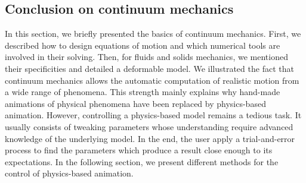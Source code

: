 \subsection{Conclusion on continuum mechanics}
In this section, we briefly presented the basics of continuum mechanics.
First, we described how to design equations of motion and which numerical tools are involved in their solving. 
Then, for fluids and solids mechanics, we mentioned their specificities and detailed a deformable model.
We illustrated the fact that continuum mechanics allows the automatic computation of realistic motion from a wide range of phenomena.
This strength mainly explains why hand-made animations of physical phenomena have been replaced by physics-based animation.
However, controlling a physics-based model remains a tedious task. 
It usually consists of tweaking parameters whose understanding require advanced knowledge of the underlying model. 
In the end, the user apply a trial-and-error process to find the parameters which produce a result close enough to its expectations.
In the following section, we present different methods for the control of physics-based animation.
